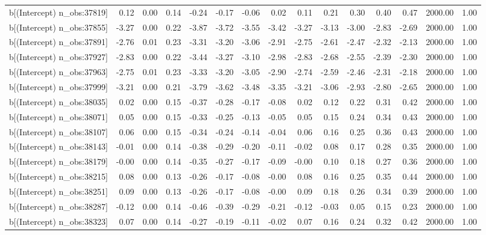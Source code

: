 \begin{table}[ht]
\begin{tabular}{rrrrrrrrrrrrrrr}
  b[(Intercept) n\_obs:37819] & 0.12 & 0.00 & 0.14 & -0.24 & -0.17 & -0.06 & 0.02 & 0.11 & 0.21 & 0.30 & 0.40 & 0.47 & 2000.00 & 1.00 \\ 
  b[(Intercept) n\_obs:37855] & -3.27 & 0.00 & 0.22 & -3.87 & -3.72 & -3.55 & -3.42 & -3.27 & -3.13 & -3.00 & -2.83 & -2.69 & 2000.00 & 1.00 \\ 
  b[(Intercept) n\_obs:37891] & -2.76 & 0.01 & 0.23 & -3.31 & -3.20 & -3.06 & -2.91 & -2.75 & -2.61 & -2.47 & -2.32 & -2.13 & 2000.00 & 1.00 \\ 
  b[(Intercept) n\_obs:37927] & -2.83 & 0.00 & 0.22 & -3.44 & -3.27 & -3.10 & -2.98 & -2.83 & -2.68 & -2.55 & -2.39 & -2.30 & 2000.00 & 1.00 \\ 
  b[(Intercept) n\_obs:37963] & -2.75 & 0.01 & 0.23 & -3.33 & -3.20 & -3.05 & -2.90 & -2.74 & -2.59 & -2.46 & -2.31 & -2.18 & 2000.00 & 1.00 \\ 
  b[(Intercept) n\_obs:37999] & -3.21 & 0.00 & 0.21 & -3.79 & -3.62 & -3.48 & -3.35 & -3.21 & -3.06 & -2.93 & -2.80 & -2.65 & 2000.00 & 1.00 \\ 
  b[(Intercept) n\_obs:38035] & 0.02 & 0.00 & 0.15 & -0.37 & -0.28 & -0.17 & -0.08 & 0.02 & 0.12 & 0.22 & 0.31 & 0.42 & 2000.00 & 1.00 \\ 
  b[(Intercept) n\_obs:38071] & 0.05 & 0.00 & 0.15 & -0.33 & -0.25 & -0.13 & -0.05 & 0.05 & 0.15 & 0.24 & 0.34 & 0.43 & 2000.00 & 1.00 \\ 
  b[(Intercept) n\_obs:38107] & 0.06 & 0.00 & 0.15 & -0.34 & -0.24 & -0.14 & -0.04 & 0.06 & 0.16 & 0.25 & 0.36 & 0.43 & 2000.00 & 1.00 \\ 
  b[(Intercept) n\_obs:38143] & -0.01 & 0.00 & 0.14 & -0.38 & -0.29 & -0.20 & -0.11 & -0.02 & 0.08 & 0.17 & 0.28 & 0.35 & 2000.00 & 1.00 \\ 
  b[(Intercept) n\_obs:38179] & -0.00 & 0.00 & 0.14 & -0.35 & -0.27 & -0.17 & -0.09 & -0.00 & 0.10 & 0.18 & 0.27 & 0.36 & 2000.00 & 1.00 \\ 
  b[(Intercept) n\_obs:38215] & 0.08 & 0.00 & 0.13 & -0.26 & -0.17 & -0.08 & -0.00 & 0.08 & 0.16 & 0.25 & 0.35 & 0.44 & 2000.00 & 1.00 \\ 
  b[(Intercept) n\_obs:38251] & 0.09 & 0.00 & 0.13 & -0.26 & -0.17 & -0.08 & -0.00 & 0.09 & 0.18 & 0.26 & 0.34 & 0.39 & 2000.00 & 1.00 \\ 
  b[(Intercept) n\_obs:38287] & -0.12 & 0.00 & 0.14 & -0.46 & -0.39 & -0.29 & -0.21 & -0.12 & -0.03 & 0.05 & 0.15 & 0.23 & 2000.00 & 1.00 \\ 
  b[(Intercept) n\_obs:38323] & 0.07 & 0.00 & 0.14 & -0.27 & -0.19 & -0.11 & -0.02 & 0.07 & 0.16 & 0.24 & 0.32 & 0.42 & 2000.00 & 1.00 \\ 

\end{tabular}
\end{table}
